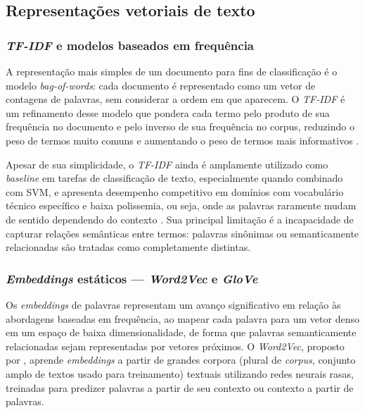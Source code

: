 \documentclass[
    12pt,                %
    openright,           %
    oneside,             %
    a4paper,             %
    english,             %
    brazil               %
]{abntex2}
\begin{document}
\subsection{Representações vetoriais de texto}
\label{subsec:pln_representacoes}

\subsubsection{\textit{TF-IDF} e modelos baseados em frequência}
\label{subsubsec:pln_tfidf}

A representação mais simples de um documento para fins de classificação é o modelo \textit{bag-of-words}: cada documento é representado como um vetor de contagens de palavras, sem considerar a ordem em que aparecem. O \textit{TF-IDF} é um refinamento desse modelo que pondera cada termo pelo produto de sua frequência no documento e pelo inverso de sua frequência no corpus, reduzindo o peso de termos muito comuns e aumentando o peso de termos mais informativos \cite{razma2026}.

Apesar de sua simplicidade, o \textit{TF-IDF} ainda é amplamente utilizado como \textit{baseline} em tarefas de classificação de texto, especialmente quando combinado com SVM, e apresenta desempenho competitivo em domínios com vocabulário técnico específico e baixa polissemia, ou seja, onde as palavras raramente mudam de sentido dependendo do contexto \cite{wahba2023}. Sua principal limitação é a incapacidade de capturar relações semânticas entre termos: palavras sinônimas ou semanticamente relacionadas são tratadas como completamente distintas.

\subsubsection{\textit{Embeddings} estáticos — \textit{Word2Vec} e \textit{GloVe}}
\label{subsubsec:pln_embeddings}

Os \textit{embeddings} de palavras representam um avanço significativo em relação às abordagens baseadas em frequência, ao mapear cada palavra para um vetor denso em um espaço de baixa dimensionalidade, de forma que palavras semanticamente relacionadas sejam representadas por vetores próximos. O \textit{Word2Vec}, proposto por , aprende \textit{embeddings} a partir de grandes corpora (plural de \textit{corpus}, conjunto amplo de textos usado para treinamento) textuais utilizando redes neurais rasas, treinadas para predizer palavras a partir de seu contexto ou contexto a partir de palavras. 
\end{document}
